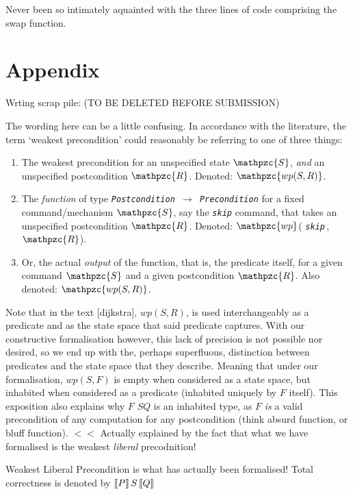 \documentclass[oneside,12pt]{article}
\newcommand{\agdamath}[1]{\emph{\texttt{\!#1}}}
\newcommand{\textM}[1]{\ensuremath{\mathpzc{#1}}}
\newcommand{\pctrip}[3]{\large{\guillemotleft}\normalsize{$#1$}\large{\guillemotright}%
  \normalsize{$#2$}\large{\guillemotleft}\normalsize{$#3$}\large{\guillemotright}\normalsize}
\newcommand{\tctrip}[3]{$\large{\llbracket}\normalsize{#1}\large{\rrbracket}\,%
  \normalsize{#2}\,\large{\llbracket}\normalsize{#3}\large{\rrbracket}\normalsize$}
\begin{document}
Never been so intimately aquainted with the three lines of code comprising the swap function.


\section{Appendix}

Wrting scrap pile: (TO BE DELETED BEFORE SUBMISSION)


The wording here can be a little confusing. In accordance with the literature, the term `weakest precondition' could reasonably be referring to one of three things:

\begin{enumerate}
\item The weakest precondition for an unspecified state \textM{S}, \emph{and} an unspecified postcondition \textM{R}. Denoted: \textM{wp(S,R)}.
\item The \emph{function} of type \agdamath{Postcondition $\rightarrow$ Precondition} for a fixed command/mechanism \textM{S}, say the \agdamath{skip} command, that takes an unspecified postcondition \textM{R}. Denoted: \textM{wp}( \agdamath{skip}\,,\,\textM{R}).
\item Or, the actual \emph{output} of the function, that is, the predicate itself, for a given command \textM{S} and a given postcondition \textM{R}. Also denoted: \textM{wp(S,R)}.
\end{enumerate}



Note that in the text [dijkstra], $wp(S,R)$, is used interchangeably as a predicate and as the state space that said predicate captures. With our constructive formalisation however, this lack of precision is not possible nor desired, so we end up with the, perhaps superfluous, distinction between predicates and the state space that they describe. Meaning that under our formalisation, $wp(S,F)$ is empty when considered as a state space, but inhabited when considered as a predicate (inhabited uniquely by $F$ itself). This exposition also explains why \pctrip{F}{S}{Q} is an inhabited type, as $F$ \emph{is} a valid precondition of any computation for any postcondition (think absurd function, or bluff function). $<<$ Actually explained by the fact that what we have formalised is the weakest \emph{liberal} precodnition!


Weakest Liberal Precondition is what has actually been formalised! Total correctness is denoted by \tctrip{P}{S}{Q}
\end{document}
